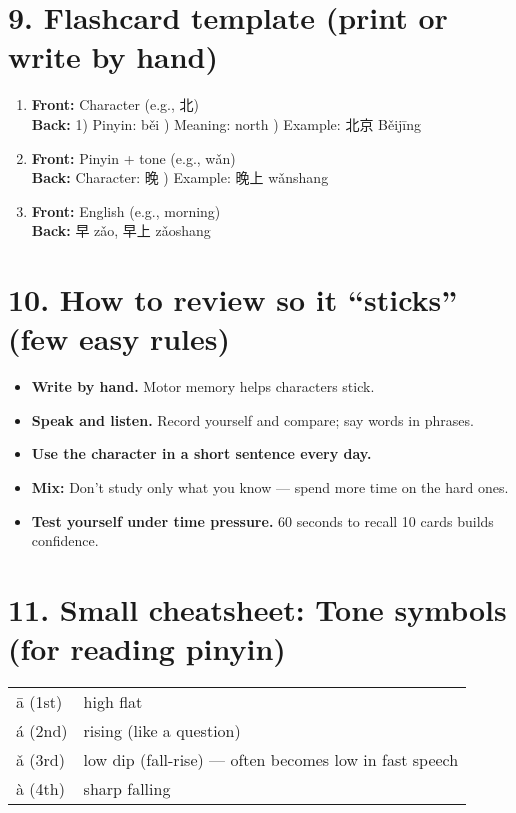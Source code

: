 \begin{CJK}{UTF8}{gbsn}
\section*{9. Flashcard template (print or write by hand)}
\begin{multicols}{2}
\begin{enumerate}[leftmargin=*]
  \item \textbf{Front:} Character (e.g., 北) \\
        \textbf{Back:} 1) Pinyin: běi ) Meaning: north ) Example: 北京 Běijīng
  \item \textbf{Front:} Pinyin + tone (e.g., wǎn) \\
        \textbf{Back:} Character: 晚 ) Example: 晚上 wǎnshang
  \item \textbf{Front:} English (e.g., morning) \\
        \textbf{Back:} 早 zǎo, 早上 zǎoshang
\end{enumerate}
\end{multicols}

\section*{10. How to review so it ``sticks'' (few easy rules)}
\begin{itemize}
  \item \textbf{Write by hand.} Motor memory helps characters stick.
  \item \textbf{Speak and listen.} Record yourself and compare; say words in phrases.
  \item \textbf{Use the character in a short sentence every day.}
  \item \textbf{Mix:} Don’t study only what you know — spend more time on the hard ones.
  \item \textbf{Test yourself under time pressure.} 60 seconds to recall 10 cards builds confidence.
\end{itemize}

\section*{11. Small cheatsheet: Tone symbols (for reading pinyin)}
\begin{tabular}{ll}
ā (1st) & high flat \\
á (2nd) & rising (like a question) \\
ǎ (3rd) & low dip (fall-rise) — often becomes low in fast speech \\
à (4th) & sharp falling \\
\end{tabular}


\end{CJK}
